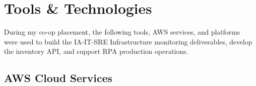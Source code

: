 ﻿%

\chapter{Tools \& Technologies}
\label{chap:tools}

During my co-op placement, the following tools, AWS services, and platforms
were used to build the IA-IT-SRE Infrastructure monitoring deliverables,
develop the inventory API, and support RPA production operations.


\FloatBarrier

\section{AWS Cloud Services}
\label{sec:tools_aws}


